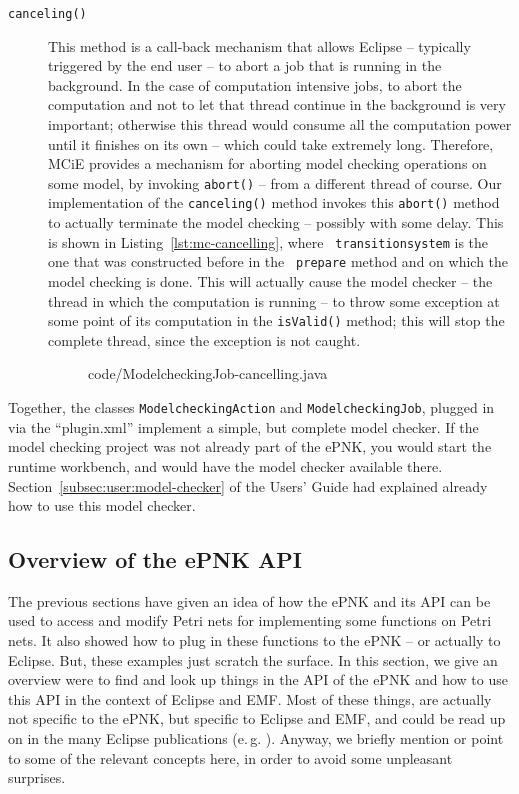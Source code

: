 \begin{description}
\item[{\tt canceling()}] This method is a call-back mechanism that allows
     Eclipse -- typically triggered by the end user -- to abort a job that is
     running in the background.
     In the case of computation intensive jobs, to abort the
     computation and not to let that thread continue in the background is very
     important; otherwise this thread would consume all the computation power
     until it finishes on its own -- which could take extremely long. Therefore,
     MCiE provides a mechanism for aborting model checking operations on some
     model, by invoking {\tt abort()} -- from a different thread of course. Our
     implementation of the {\tt canceling()} method invokes this {\tt abort()}
     method to actually terminate the model checking -- possibly with some
     delay. This is shown in Listing~\ref{lst:mc-cancelling}, where {\tt
     transitionsystem} is the one that was constructed before in the {\tt
     prepare} method and on which the model checking is done. This will actually
     cause the model checker -- the thread in which the computation is
     running -- to throw some exception at some
     point of its computation in the {\tt isValid()} method; this will stop
     the complete thread, since the exception is not caught.
%
\begin{figure}[tbp!] %
%
{code/ModelcheckingJob-cancelling.java}  
\end{figure}
\end{description}

Together, the classes {\tt ModelcheckingAction} and {\tt ModelcheckingJob},
plugged in via the ``plugin.xml'' implement a simple, but complete model
checker. If the model checking project was not already part of the ePNK, you
would start the runtime workbench, and would have the model checker
available there.  Section~\ref{subsec:user:model-checker} of the
Users' Guide had explained already how to use this model checker.%

\subsection{Overview of the ePNK API}
\label{subsec:devloper:functitions:utilities}

The previous sections have given an idea of how the ePNK and its
API can be used to access and modify Petri nets for implementing some
functions on Petri nets. It also showed how to plug in these functions
to the ePNK -- or actually to Eclipse. But, these examples just scratch
the surface. In this section, we give an overview were to find and look
up things in the API of the ePNK and how to use this API in the context
of Eclipse and EMF. Most of these things, are actually not specific to
the ePNK, but specific to Eclipse and EMF, and could be read up on
in the many Eclipse publications (e.\,g. \cite{BSM06,ClRu08,Gro09}).
Anyway, we briefly mention or point to some of the relevant concepts
here, in order to avoid some unpleasant surprises.

